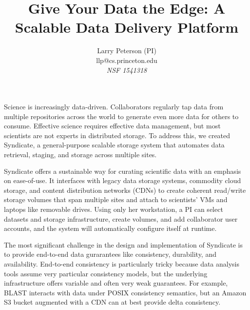 \documentclass[letterpaper,twocolumn,10pt]{article}
\begin{document}
\date{}

\title{\Large \bf Give Your Data the Edge: A Scalable Data Delivery Platform}

\author{\rm Larry Peterson (PI)\\
llp@cs.princeton.edu\\
\emph{NSF 1541318}
}

\maketitle

\thispagestyle{empty}

\setlength{\parskip}{0pt}
\setlength{\parsep}{0pt}
\setlength{\headsep}{0pt}
\setlength{\topskip}{0pt}
\setlength{\topmargin}{0pt}
\setlength{\topsep}{0pt}
\setlength{\partopsep}{0pt}

Science is increasingly data-driven.  Collaborators regularly tap data from
multiple repositories across the world to generate even more data for others to
consume.  Effective science requires effective data management, but most scientists are
not experts in distributed storage.  To address this, we created Syndicate, a
general-purpose scalable storage system that automates data retrieval, staging,
and storage across multiple sites.

Syndicate offers a sustainable way for curating scientific data with an emphasis
on ease-of-use.  It interfaces with legacy data storage systems,
commodity cloud storage, and content distribution networks (CDNs) to create coherent
read/write storage volumes that span multiple sites and attach to scientists' VMs and laptops like
removable drives.  Using only her workstation, a PI can select datasets and
storage infrastructure, create volumes, and add collaborator user accounts, and the system
will automatically configure itself at runtime.

The most significant challenge in the design and implementation of Syndicate
is to provide end-to-end data gurarantees like consistency, durability, and
availability.  End-to-end consistency is particularly
tricky because data analysis tools assume very particular consistency
models, but the underlying infrastructure offers variable and often very weak
guarantees.  For example, BLAST interacts with data under POSIX
consistency semantics, but an Amazon S3 bucket augmented with a CDN can at best
provide delta consistency.
\end{document}
